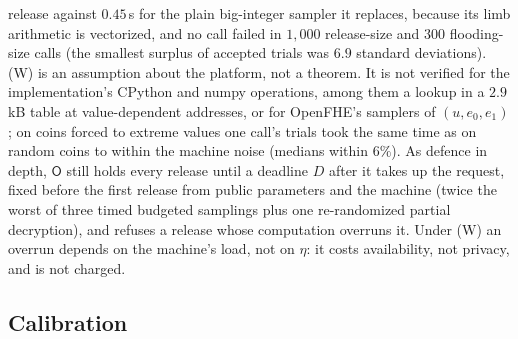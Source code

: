 \documentclass[11pt]{article}
\theoremstyle{definition}
\theoremstyle{plain}
\newcommand{\Party}[1]{\textsf{#1}}
\newcommand{\Op}{\Party{O}}
\begin{document}
release against $0.45$\,s for the plain big-integer sampler it replaces, because its limb arithmetic is vectorized, and no call failed in $1{,}000$ release-size and $300$ flooding-size calls (the smallest surplus of accepted trials was $6.9$ standard deviations). (W) is an assumption about the platform, not a theorem. It is not verified for the implementation's CPython and numpy operations, among them a lookup in a $2.9$\,kB table at value-dependent addresses, or for OpenFHE's samplers of $(u, e_0, e_1)$; on coins forced to extreme values one call's trials took the same time as on random coins to within the machine noise (medians within $6\%$). As defence in depth, $\Op$ still holds every release until a deadline $D$ after it takes up the request, fixed before the first release from public parameters and the machine (twice the worst of three timed budgeted samplings plus one re-randomized partial decryption), and refuses a release whose computation overruns it. Under (W) an overrun depends on the machine's load, not on $\eta$: it costs availability, not privacy, and is not charged.

\subsection{Calibration}
\label{sec:privacy:calib}
\end{document}
